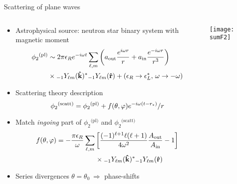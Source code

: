 \documentclass[9pt]{beamer}
\newcommand{\uu}[3][]{ {}_{#1} #2_{#3} }
\begin{document}
{
\begin{frame}[fragile]{Scattering of plane waves}
	\begin{columns}[T]      
		\begin{column}{0.6\textwidth}
			\begin{itemize}
				\setlength\itemsep{1em}
				\item Astrophysical source: neutron star binary system with magnetic moment
				\begin{align*}
					\phi_2{}^\text{(pl)} &\sim 2 \pi \epsilon_R e^{-i \omega t} \sum_{\ell,m} \left(
						a_\mathrm{out} \frac{e^{i \omega r}}{r} 
						+ a_\mathrm{in} \frac{e^{-i \omega r}}{r^3} \right) \\
						&\hspace*{0cm}\times \uu[-1]{Y}{\ell m}(\mathbf{\hat{k}})^{*} \uu[-1]{Y}{\ell m}(\mathbf{\hat{r}})
						+ (\epsilon_R \to \epsilon_L^*, \,\omega \to -\omega )
				\end{align*}

				\item Scattering theory description 
				$$ \displaystyle \phi_2{}^\text{(scatt)} =  \phi_2{}^\text{(pl)} + f(\theta,\varphi) e^{- i \omega ( t - r_* )} /r \vspace{0.1cm}$$

				\item Match \emph{ingoing} part of $\phi_2{}^\text{(pl)}$ and $\phi_2{}^\text{(scatt)}$
				\begin{align*}
					f(\theta,\varphi) &= - \frac{\pi \epsilon_R}{\omega} \sum_{\ell,m} \left[\frac{(-1)^{\ell+1} \ell(\ell+1)}{4 \omega^2 }
					\frac{A_\mathrm{out}}{A_\mathrm{in}} - 1 \right] \\
					& \hspace*{2cm}\times \uu[-1]{Y}{\ell m}(\mathbf{\hat{k}})^{*} \uu[-1]{Y}{\ell m}(\mathbf{\hat{r}})
				\end{align*}

				\item Series divergences $\theta=\theta_0 ~\Rightarrow$ \alert{phase-shifts}
			\end{itemize}
			\vfill
		\end{column}
		\begin{column}{0.4\textwidth}
			\vspace{4.75cm}
			\texttt{[image: sumF2]}
		\end{column}
	\end{columns}
\end{frame}
}
\end{document}
